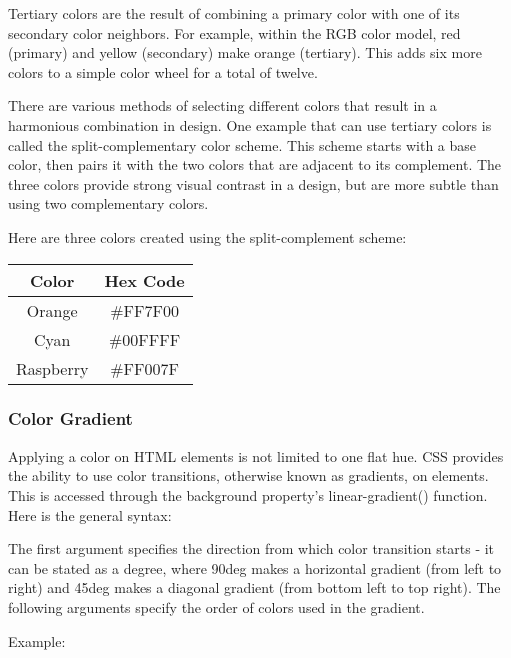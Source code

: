 Tertiary colors are the result of combining a primary color with one of its secondary color neighbors. For example, within the RGB color model, red (primary) and yellow (secondary) make orange (tertiary). This adds six more colors to a simple color wheel for a total of twelve.

There are various methods of selecting different colors that result in a harmonious combination in design. One example that can use tertiary colors is called the split-complementary color scheme. This scheme starts with a base color, then pairs it with the two colors that are adjacent to its complement. The three colors provide strong visual contrast in a design, but are more subtle than using two complementary colors.

Here are three colors created using the split-complement scheme:
\begin{table}[h]
    \centering
    \begin{tabular}{c|c}
         Color&Hex Code  \\
         \hline\hline
         Orange& \#FF7F00\\
         Cyan & \#00FFFF\\
         Raspberry&\#FF007F\\
    \end{tabular}
\end{table}

\subsubsection{Color Gradient}
Applying a color on HTML elements is not limited to one flat hue. CSS provides the ability to use color transitions, otherwise known as gradients, on elements. This is accessed through the background property's linear-gradient() function. Here is the general syntax:


The first argument specifies the direction from which color transition starts - it can be stated as a degree, where 90deg makes a horizontal gradient (from left to right) and 45deg makes a diagonal gradient (from bottom left to top right). The following arguments specify the order of colors used in the gradient.

Example:


